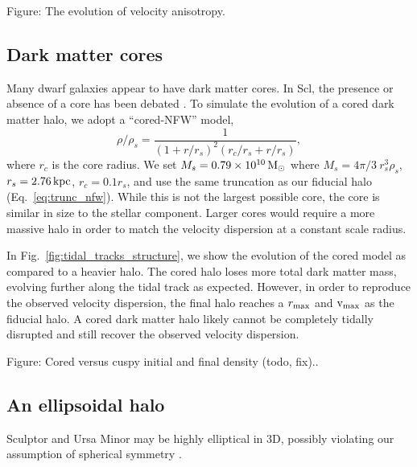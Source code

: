 
Figure: The evolution of velocity anisotropy.

\subsection{Dark matter cores}\label{dark-matter-cores}

Many dwarf galaxies appear to have dark matter cores. In Scl, the
presence or absence of a core has been debated
\citep[e.g.,][]{battaglia+2008, walker+2009a, agnello+evans2012, breddels+helmi2013, amorisco+zavala+deboer2014, richardson+fairbairn2014}.
To simulate the evolution of a cored dark matter halo, we adopt a
``cored-NFW'' model, \begin{equation}{
\rho/\rho   _s = \frac{1}{(1+r/r_s)^2 (r_c/r_s + r/r_s)},
}\end{equation} where \(r_c\) is the core radius. We set
\(M_s=0.79\times10^{10}\,{\rm M}_{\odot}\) where \(M_s = 4\pi/3\ r_s^3 \rho_s\),
\(r_s=2.76\,{\rm kpc}\), \(r_c=0.1r_s\), and use the same truncation as our
fiducial halo (Eq.~\ref{eq:trunc_nfw}). While this is not the largest
possible core, the core is similar in size to the stellar component.
Larger cores would require a more massive halo in order to match the
velocity dispersion at a constant scale radius.

In Fig.~\ref{fig:tidal_tracks_structure}, we show the evolution of the
cored model as compared to a heavier halo. The cored halo loses more
total dark matter mass, evolving further along the tidal track as
expected. However, in order to reproduce the observed velocity
dispersion, the final halo reaches a \(r_{\rm max}\) and \({\rm v}_{\rm max}\) as the
fiducial halo. A cored dark matter halo likely cannot be completely
tidally disrupted and still recover the observed velocity dispersion.


Figure: Cored versus cuspy initial and final density (todo, fix)..

\subsection{An ellipsoidal halo}\label{an-ellipsoidal-halo}

Sculptor and Ursa Minor may be highly elliptical in 3D, possibly
violating our assumption of spherical symmetry
\citep[e.g.,][]{an+koposov2022}.

